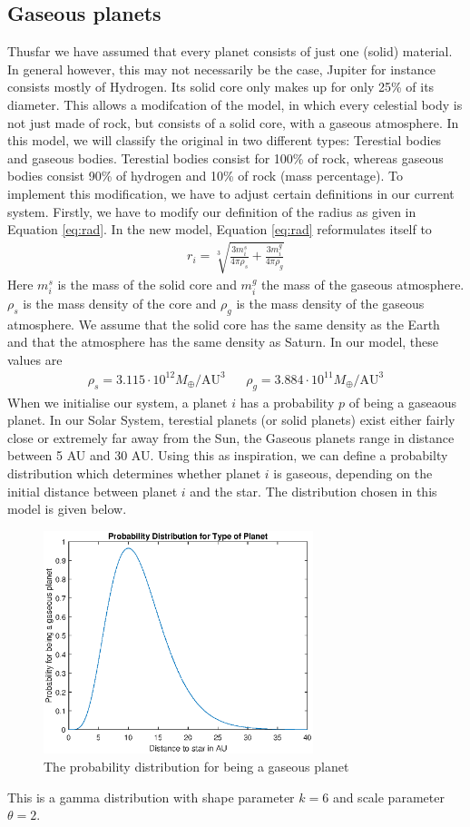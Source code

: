 \subsection{Gaseous planets}
Thusfar we have assumed that every planet consists of just one (solid) material. 
In general however, this may not necessarily be the case, Jupiter for instance consists mostly of Hydrogen. Its solid core only makes up for only 25\% of its diameter.
This allows a modifcation of the model, in which every celestial body is not just made of rock, but consists of a solid core, with a gaseous atmosphere. 
In this model, we will classify the original in two different types: Terestial bodies and gaseous bodies.
 Terestial bodies consist for 100\% of rock, whereas gaseous bodies consist 90\% of hydrogen and 10\% of rock (mass percentage). To implement this modification, we have to adjust certain definitions in our current system. Firstly, we have to modify our definition of the radius as given in Equation \eqref{eq:rad}. In the new model, Equation \eqref{eq:rad} reformulates itself to
 \begin{align*}
 r_i=\sqrt[3]{\frac{3 m_i^s}{4\pi \rho_s}+\frac{3 m_i^g}{4\pi \rho_g}}
 \end{align*}
 Here \(m_i^s\) is the mass of the solid core and \(m_i^g\) the mass of the gaseous atmosphere. \(\rho_s\) is the mass density of the core and \(\rho_g\) is the mass density of the gaseous atmosphere. 
 We assume that the solid core has the same density as the Earth and that the atmosphere has the same density as Saturn. 
 In our model, these values are 
 \begin{align*}
 \rho_s =3.115\cdot 10^{12}{M_{\oplus}}/{\text{AU}^3} && \rho_g = 3.884\cdot 10^{11}{M_{\oplus}}/{\text{AU}^3}
 \end{align*}
When we initialise our system, a planet \(i\) has a probability \(p\) of being a gaseaous planet. 
In our Solar System, terestial planets (or solid planets) exist either fairly close or extremely far away from the Sun, the Gaseous planets range in distance between 5 AU and 30 AU. 
Using this as inspiration, we can define a probabilty distribution which determines whether planet \(i\) is gaseous, depending on the initial distance between planet \(i\) and the star. The distribution chosen in this model is given below.
 
\begin{figure}[H]
  \centering
  \includegraphics[width=0.7\textwidth]{probdistrgasplan}
  \caption{The probability distribution for being a gaseous planet}
  \label{fig:probdist}
\end{figure}
This is a gamma distribution with shape parameter \(k=6\) and scale parameter \(\theta =2\).
